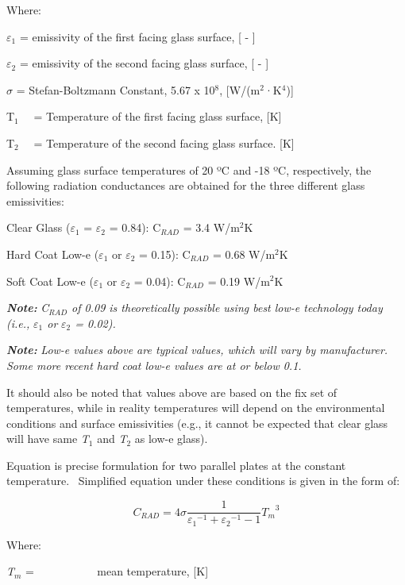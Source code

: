 Where:

$\varepsilon$\(_{1}\) = emissivity of the first facing glass surface, {[} - {]}

$\varepsilon$\(_{2}\) = emissivity of the second facing glass surface, {[} - {]}

\(\sigma\) = Stefan-Boltzmann Constant, 5.67 x 10\(^{8}\), {[}W/(m\(^{2}\)·K\(^{4}\)){]}

T\(_{1}\)~~ = Temperature of the first facing glass surface, {[}K{]}

T\(_{2}\)~~ = Temperature of the second facing glass surface. {[}K{]}

Assuming glass surface temperatures of 20 ºC and -18 ºC, respectively, the following radiation conductances are obtained for the three different glass emissivities:

Clear Glass ($\varepsilon$\(_{1}\) = $\varepsilon$\(_{2}\) = 0.84): C\(_{RAD}\) = 3.4 W/m\(^{2}\)K

Hard Coat Low-e ($\varepsilon$\(_{1}\) or $\varepsilon$\(_{2}\) = 0.15): C\(_{RAD}\) = 0.68 W/m\(^{2}\)K

Soft Coat Low-e ($\varepsilon$\(_{1}\) or $\varepsilon$\(_{2}\) = 0.04): C\(_{RAD}\) = 0.19 W/m\(^{2}\)K

\textbf{\emph{Note:}} \emph{C\(_{RAD}\) of 0.09 is theoretically possible using best low-e technology today (i.e.,} \emph{$\varepsilon$\(_{1}\) or} \emph{$\varepsilon$\(_{2}\) = 0.02).}

\textbf{\emph{Note:}} \emph{Low-e values above are typical values, which will vary by manufacturer.~ Some more recent hard coat low-e values are at or below 0.1.}

It should also be noted that values above are based on the fix set of temperatures, while in reality temperatures will depend on the environmental conditions and surface emissivities (e.g., it cannot be expected that clear glass will have same \emph{T\(_{1}\)} and \emph{T\(_{2}\)} as low-e glass).

Equation is precise formulation for two parallel plates at the constant temperature.~ Simplified equation under these conditions is given in the form of:

\begin{equation}
{C_{RAD}} = 4\sigma \frac{1}{{{\varepsilon_1}^{ - 1} + {\varepsilon_2}^{ - 1} - 1}}{T_m}^3
\end{equation}

Where:

\emph{T\(_{m}\)} = ~~~~~~~~~~ mean temperature, {[}K{]}


